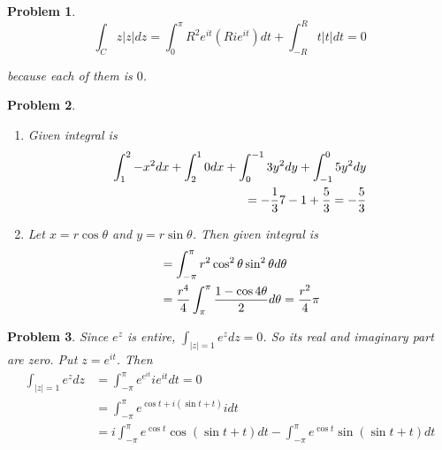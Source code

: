 \documentclass{oblivoir}
\newtheorem{problem}{Problem}
\begin{document}
\begin{problem}
	\begin{equation}
		\int_C z |z| dz = \int_0 ^\pi R^2 e^{it}\left( Rie^{it} \right)dt + \int_{-R}^R t|t| dt = 0
		\label{<+label+>}
	\end{equation}

	because each of them is $0$.
\end{problem}

\begin{problem}
	\begin{enumerate}[label = (\alph*)]
		\item Given integral is
			\begin{equation}
				\begin{split}
					\int_1^2 -x^2 dx + \int_2^1 0 dx + \int_0^{-1}3y^2 dy + \int_{-1}^0 5y^2 dy \\
					= -{1\over 3}7 -1 + {5 \over 3} = -{5 \over 3}
				\end{split}
				\label{<+label+>}
			\end{equation}

		\item Let $x = r \cos \theta$ and $y = r \sin \theta$. Then given integral is
			\begin{equation}
				\begin{split}
					& = \int_{-\pi}^\pi r^2 \cos^2 \theta \sin^2 \theta d\theta\\
					& = {r^4 \over 4} \int_{\pi}^\pi \frac{1 - \cos 4\theta}{2}d\theta = {r^2 \over 4} \pi
				\end{split}
				\label{<+label+>}
			\end{equation}
	\end{enumerate}
\end{problem}

\begin{problem}
	Since $e^z$ is entire, $\int_{|z| = 1} e^z dz = 0$. So its real and imaginary part are zero.
	Put $z = e^{it}$. Then
	\begin{equation}
		\begin{split}
			\int_{|z| = 1}e^z dz & = \int_{-\pi}^\pi e^{e^{it}}ie^{it}dt = 0 \\
			& = \int_{-\pi}^\pi e^{\cos t + i\left( \sin t + t \right)} i dt \\
			& = i\int_{-\pi}^\pi e^{\cos t} \cos \left( \sin t + t \right) dt - \int_{-\pi}^\pi e^{\cos t} \sin \left(  \sin t + t \right) dt \\
		\end{split}
		\label{<+label+>}
	\end{equation}
\end{problem}
\end{document}

